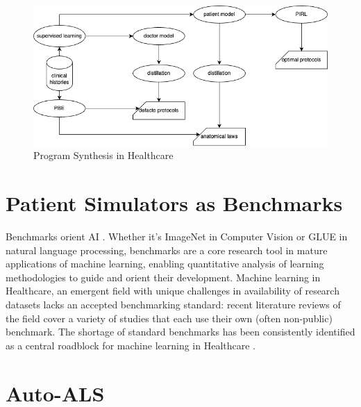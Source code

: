 \begin{figure}
    \centering
    \includegraphics[width=\linewidth]{images/PSHealth.drawio.png}
    \caption{Program Synthesis in Healthcare}
    \label{fig:pshealth}
\end{figure}




\newpage
\section{Patient Simulators as Benchmarks}

Benchmarks orient AI \cite{liangHolisticEvaluationLanguage2022}. Whether it's ImageNet \cite{dengImagenetLargescaleHierarchical2009} in Computer Vision or GLUE \cite{wangGLUEMultitaskBenchmark2018} in natural language processing, benchmarks are a core research tool in mature applications of machine learning, enabling quantitative analysis of learning methodologies to guide and orient their development.
Machine learning in Healthcare, an emergent field with unique challenges in availability of research datasets \cite{Anshik2021Handling, Gilbert2015market, Pahwa2021Big, Yazhini2019State} lacks an accepted benchmarking standard: recent literature reviews \cite{palMachineLearningHealthcare2023,tortorellaHealthcareTrendsChallenges2020} of the field cover a variety of studies that each use their own (often non-public) benchmark. The shortage of standard benchmarks has been consistently identified as a central roadblock for machine learning in Healthcare
\cite{Crown2015Potential, David2020Evaluating, guSupervisedLearningPervasive2023, harutyunyanMultitaskLearningBenchmarking2019, Kathrin2022Benchmark, liventsevEffectivePatientSimulators2021, mcdermottReproducibilityMachineLearning2021, purushothamBenchmarkingDeepLearning2018, S2017Benchmark}.

\newpage
\section{Auto-ALS}
\label{sec:virtu-als}

